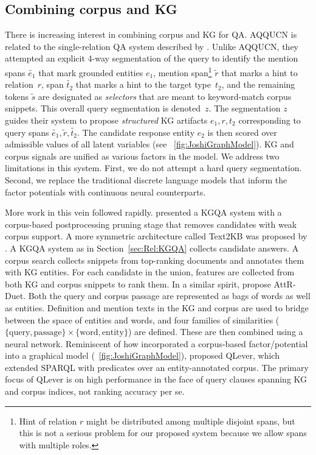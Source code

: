 \documentclass{svjour3}
\begin{document}
\subsection{Combining corpus and KG}
\label{sec:Rel:CorpusKGQA}

There is increasing interest in combining corpus and KG for QA.  AQQUCN is related to the single-relation QA system described by \citet{JoshiSC2014KgCorpusJoint}.  Unlike AQQUCN, they attempted an explicit 4-way segmentation of the query to identify the mention spans $\tilde{e_1}$ that mark grounded entities $e_1$, mention span\footnote{Hint of relation $r$ might be distributed among multiple disjoint spans, but this is not a serious problem for our proposed system because we allow spans with multiple roles.} $\tilde{r}$ that marks a hint to relation~$r$, span $\tilde{t_2}$ that marks a hint to the target type~$t_2$, and the remaining tokens $\tilde{s}$ are designated as \emph{selectors} that are meant to keyword-match corpus snippets.  This overall query segmentation is denoted~$z$.  The segmentation $z$ guides their system to propose \emph{structured} KG artifacts $e_1, r, t_2$ corresponding to query spans $\tilde{e_1}, \tilde{r}, \tilde{t_2}$.  The candidate response entity $e_2$ is then scored over admissible values of all latent variables (see \figurename~\ref{fig:JoshiGraphModel}).  KG and corpus signals are unified as various factors in the model.  We address two limitations in this system.  First, we do not attempt a hard query segmentation.  Second, we replace the traditional discrete language models that inform the factor potentials with continuous neural counterparts.

More work in this vein followed rapidly.  \citet{XuRFHZ2016FbCorpusQA} presented a KGQA system with a corpus-based postprocessing pruning stage that removes candidates with weak corpus support.  A more symmetric architecture called Text2KB was proposed by \citet{SavenkovA2016KbCorpusQa}.  A KGQA system as in Section~\ref{sec:Rel:KGQA} collects candidate answers.  A corpus search collects snippets from top-ranking documents and annotates \citep{GlobersonLCSRP2016MultiFocal, GaneaH2017DeepNed} them with KG entities.  For each candidate in the union, features are collected from both KG and corpus snippets to rank them.  In a similar spirit, \citet{XiongCL2017WordEntityDuet} propose AttR-Duet.  Both the query and corpus passage are represented as bags of words as well as entities.  Definition and mention texts in the KG and corpus are used to bridge between the space of entities and words, and four families of similarities ($\{\text{query}, \text{passage}\} \times \{\text{word}, \text{entity}\}$) are defined.  These are then combined using a neural network.  Reminiscent of how \citet{JoshiSC2014KgCorpusJoint} incorporated a corpus-based factor/potential into a graphical model (\figurename~\ref{fig:JoshiGraphModel}), \citet{BastB2017QLever} proposed QLever, which extended \citep{Chakrabarti2010WSDM} SPARQL with predicates over an entity-annotated corpus.  The primary focus of QLever is on high performance in the face of query clauses spanning KG and corpus indices, not ranking accuracy per se.
\end{document}
